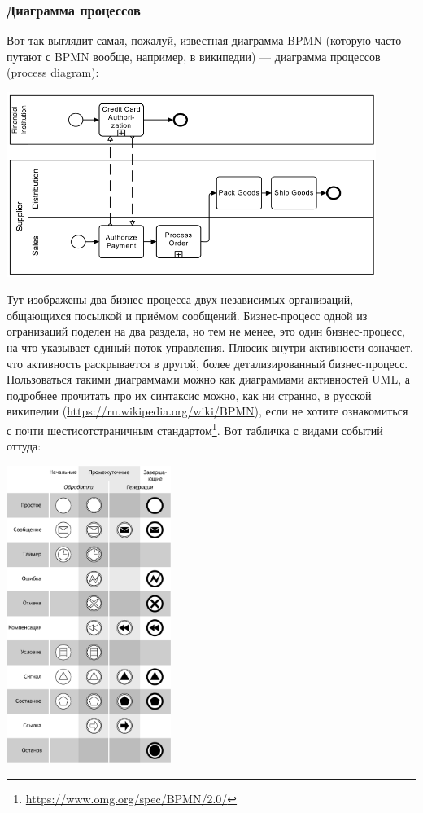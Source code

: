 \documentclass{../../text-style}
\begin{document}
\subsubsection{Диаграмма процессов}

Вот так выглядит самая, пожалуй, известная диаграмма BPMN (которую часто путают с BPMN вообще, например, в википедии) --- диаграмма процессов (process diagram):

\begin{center}
    \includegraphics[width=0.9\textwidth]{bpmnExample.png}
\end{center}

Тут изображены два бизнес-процесса двух независимых организаций, общающихся посылкой и приёмом сообщений. Бизнес-процесс одной из огранизаций поделен на два раздела, но тем не менее, это один бизнес-процесс, на что указывает единый поток управления. Плюсик внутри активности означает, что активность раскрывается в другой, более детализированный бизнес-процесс. Пользоваться такими диаграммами можно как диаграммами активностей UML, а подробнее прочитать про их синтаксис можно, как ни странно, в русской википедии (\url{https://ru.wikipedia.org/wiki/BPMN}), если не хотите ознакомиться с почти шестисотстраничным стандартом\footnote{\url{https://www.omg.org/spec/BPMN/2.0/}}. Вот табличка с видами событий оттуда:

\begin{center}
    \includegraphics[width=0.4\textwidth]{bpmnEvents.png}
\end{center}
\end{document}
